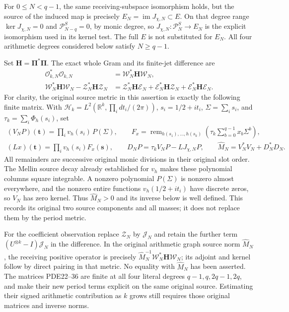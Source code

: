 For $0\leq N<q-1$, the same receiving-subspace isomorphism holds,
but the source of the induced map is precisely
$E_N=\operatorname{im}J_{\chi,N}\subset E$. On that degree range
$\ker J_{\chi,N}=0$ and $\mathcal P_{N-q}^S=0$, by monic degree,
so $J_{\chi,N}:\mathcal P_N^S\to E_N$ is the explicit isomorphism
used in its kernel test. The full $E$ is not substituted for $E_N$.
All four arithmetic degrees considered below satisfy $N\geq q-1$.

Set $\boldsymbol H=\boldsymbol\Pi^*\boldsymbol\Pi$. The exact whole
Gram and its finite-jet difference are
\[
 \begin{split}
 \mathcal O_{k,N}^*\mathcal O_{k,N}
                 &=\mathcal W_N^*\boldsymbol H\mathcal W_N,\\
 \mathcal W_N^*\boldsymbol H\mathcal W_N
       -\mathcal Z_N^*\boldsymbol H\mathcal Z_N
                 &=\mathcal Z_N^*\boldsymbol H\mathcal E_N
                  +\mathcal E_N^*\boldsymbol H\mathcal Z_N
                  +\mathcal E_N^*\boldsymbol H\mathcal E_N.
 \end{split}
 \tag{PDE36}
\]
For clarity, the original source metric in this assertion is exactly
the following finite matrix. With
$\mathscr H_k=L^2(\mathbb{R}^k,\prod_i dt_i/(2\pi))$,
$s_i=1/2+it_i$, $\Sigma=\sum_i s_i$, and
$\tau_k=\sum_i\Phi_h(s_i)$, set
\[
 \begin{gathered}
 (V_NP)(\mathbf t)=\prod_i v_h(s_i)\,P(\Sigma),\qquad
 F_x=\operatorname{rem}_{h(s_1),\ldots,h(s_k)}
                \left(\tau_k\sum_{b=0}^{q-1}x_b\Sigma^b\right),\\
 (Lx)(\mathbf t)=\prod_i v_h(s_i)F_x(\mathbf s),\qquad
 D_NP=\tau_kV_NP-LJ_{\chi,N}P,\qquad
 \widehat M_N=V_N^*V_N+D_N^*D_N.
 \end{gathered}
 \tag{PDE36a}
\]
All remainders are successive original monic divisions in their
original slot order. The Mellin source decay already established for
$v_h$ makes these polynomial columns square integrable. A nonzero
polynomial $P(\Sigma)$ is nonzero almost everywhere, and the nonzero
entire functions $v_h(1/2+it_i)$ have discrete zeros, so $V_N$ has zero
kernel. Thus $\widehat M_N>0$ and its inverse below is well defined.
This records its original two source components and all masses;
it does not replace them by the period metric.

For the coefficient observation replace $\mathcal Z_N$ by
$\mathcal J_N$ and retain the further term
$(U^{\otimes k}-I)\mathcal J_N$ in the difference. In the original
arithmetic graph source norm $\widehat M_N$, the receiving positive
operator is precisely
$\widehat M_N^{-1}\mathcal W_N^*\boldsymbol H\mathcal W_N$;
its adjoint and kernel follow by direct pairing in that metric.
No equality with $\widehat M_N$ has been asserted. The matrices
PDE22--36 are finite at all four literal degrees
$q-1,q,2q-1,2q$, and make their new period terms explicit on the same
original source. Estimating their signed arithmetic contribution as
$k$ grows still requires those original matrices and inverse norms.

